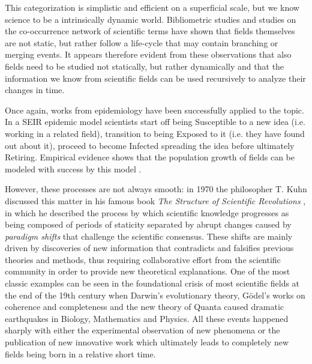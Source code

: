 This categorization is simplistic and efficient on a superficial scale,
but we know science to be a intrinsically dynamic world. Bibliometric studies \cite{WeiweiCui2011} and studies on the co-occurrence network of scientific terms \cite{10.1371/journal.pone.0054847} have shown
that fields themselves are not static, but rather follow a life-cycle that may contain branching or merging events. It appears therefore evident from these observations that also
fields need to be studied not statically, but rather dynamically and that the information we know from scientific fields can be used recursively to analyze their changes
in time. 

Once again, works from epidemiology have been successfully applied to the topic. In a SEIR epidemic model scientists start off
being Susceptible to a new idea (i.e. working in a related field), transition to being Exposed to it (i.e. they have found out about it), proceed to become Infected spreading the idea before ultimately Retiring. 
Empirical evidence shows that the population growth of fields can be modeled with success by this 
model \cite{Bettencourt2008}. 

However, these processes are not always smooth: in 1970 the philosopher T. Kuhn discussed this matter in his famous book \textit{The Structure of Scientific Revolutions
} \cite{Kuhn:1970}, in which he described the process by which scientific knowledge progresses as being composed of periods of staticity separated by abrupt changes caused by \textit{paradigm
shifts} that challenge the scientific consensus. These shifts are mainly driven by discoveries of new information that contradicts and falsifies previous theories
and methods, thus requiring collaborative effort from the scientific community in order to provide new theoretical explanations. One of the most classic examples can be 
seen in the foundational crisis of most scientific fields at the end of the 19th century when Darwin's evolutionary theory, G{\"o}del's works on coherence and completeness and the new theory of Quanta
caused dramatic earthquakes in Biology, Mathematics and Physics. All these events happened sharply with either the experimental observation of new phenomena or the publication
of new innovative work which ultimately leads to completely new fields being born in a relative short time. 

